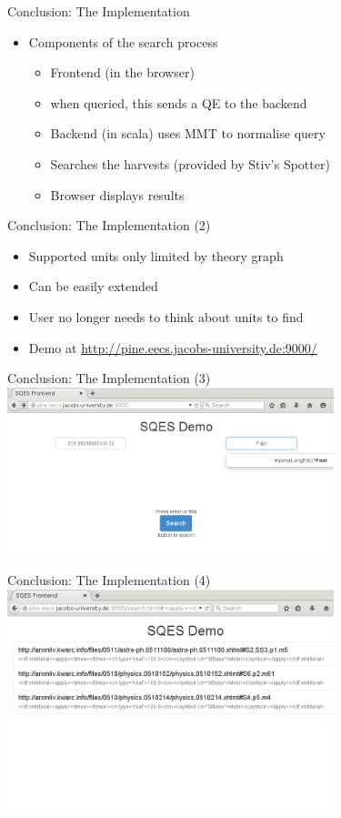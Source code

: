 \documentclass{beamer}
\begin{document}
  \begin{frame}{Conclusion: The Implementation}
    \begin{itemize}[<+->]
      \item Components of the search process
      \begin{itemize}
        \item Frontend (in the browser)
        \item when queried, this sends a QE to the backend
        \item Backend (in scala) uses MMT to normalise query
        \item Searches the harvests (provided by Stiv's Spotter)
        \item Browser displays results
      \end{itemize}
    \end{itemize}
  \end{frame}

  \begin{frame}{Conclusion: The Implementation (2)}
    \begin{itemize}[<+->]
      \item Supported units only limited by theory graph
      \item Can be easily extended
      \item User no longer needs to think about units to find
      \item Demo at \url{http://pine.eecs.jacobs-university.de:9000/}
    \end{itemize}
  \end{frame}

  \begin{frame}{Conclusion: The Implementation (3)}
    \includegraphics[width=95mm]{imgs/screen1.png}
  \end{frame}

  \begin{frame}{Conclusion: The Implementation (4)}
    \includegraphics[width=95mm]{imgs/screen2.png}
  \end{frame}
\end{document}
